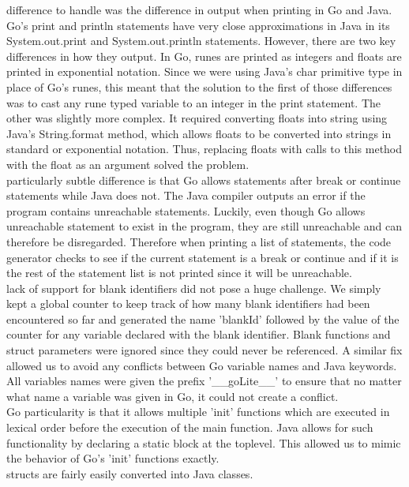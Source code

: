 \documentclass{article}
\begin{document}
 difference to handle was the difference in output when printing in Go and Java.
Go's print and println statements have very close approximations in Java in its System.out.print and System.out.println statements.
However, there are two key differences in how they output.
In Go, runes are printed as integers and floats are printed in exponential notation.
Since we were using Java's char primitive type in place of Go's runes, this meant that the solution to the first of those differences was to cast any rune typed variable to an integer in the print statement.
The other was slightly more complex.
It required converting floats into string using Java's String.format method, which allows floats to be converted into strings in standard or exponential notation.
Thus, replacing floats with calls to this method with the float as an argument solved the problem.\\
 particularly subtle difference is that Go allows statements after break or continue statements while Java does not.
The Java compiler outputs an error if the program contains unreachable statements.
Luckily, even though Go allows unreachable statement to exist in the program, they are still unreachable and can therefore be disregarded.
Therefore when printing a list of statements, the code generator checks to see if the current statement is a break or continue and if it is the rest of the statement list is not printed since it will be unreachable.
\\
 lack of support for blank identifiers did not pose a huge challenge.
We simply kept a global counter to keep track of how many blank identifiers had been encountered so far and generated the name 'blankId' followed by the value of the counter for any variable declared with the blank identifier.
Blank functions and struct parameters were ignored since they could never be referenced.
A similar fix allowed us to avoid any conflicts between Go variable names and Java keywords.
All variables names were given the prefix '\_\_goLite\_\_' to ensure that no matter what name a variable was given in Go, it could not create a conflict.\\
 Go particularity is that it allows multiple 'init' functions which are executed in lexical order before the execution of the main function.
Java allows for such functionality by declaring a static block at the toplevel.
This allowed us to mimic the behavior of Go's 'init' functions exactly.\\
 structs are fairly easily converted into Java classes.
\end{document}
